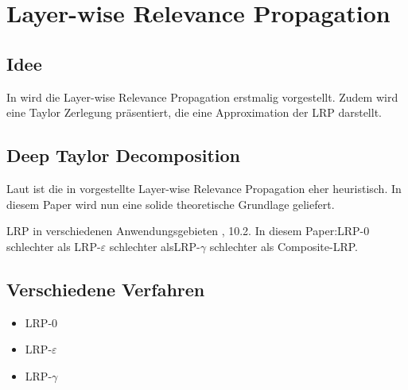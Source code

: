 \documentclass{article}
\theoremstyle{break}
\begin{document}
	\section{Layer-wise Relevance Propagation}
	\subsection{Idee}
	
	In \cite{LRP_first_paper} wird die Layer-wise Relevance Propagation erstmalig vorgestellt. Zudem wird eine Taylor Zerlegung präsentiert, die eine Approximation der LRP darstellt.
	\subsection{Deep Taylor Decomposition}
	Laut \cite{DTD} ist die in \cite{LRP_first_paper} vorgestellte Layer-wise Relevance Propagation eher heuristisch. In diesem Paper wird nun eine solide theoretische Grundlage geliefert.\\
	
	\begin{comment}
		The widely used Oaxaca decomposition applies to linear models. Extending it to commonly used nonlinear models such as binary choice and duration models is not straightforward. This paper shows that the original decomposition using a linear model can be obtained as a first order Taylor expansion. This basis provides a means of obtaining a coherent and unified approach which applies to nonlinear models, which we refer to as a Taylor decomposition. Explicit formulae are provided for the Taylor decomposition for the main nonlinear models used in applied econometrics including the Probit binary choice and Weibull duration models. The detailed decomposition of the explained component is expressed in terms of what are usually referred to as marginal effects and a remainder. Given Jensen's inequality, the latter will always be present in nonlinear models unless an ad hoc or tautological basis for decomposition is used.
	\end{comment}
	
	LRP in verschiedenen Anwendungsgebieten \cite{lrp_overview}, 10.2.
	In diesem Paper:LRP-0 schlechter als LRP-$\varepsilon$ schlechter alsLRP-$\gamma$ schlechter als Composite-LRP.
	\subsection{Verschiedene Verfahren}
	
	\begin{itemize}
		\item LRP-0
		\item LRP-$\varepsilon$
		\item LRP-$\gamma$
	\end{itemize}
\end{document}
